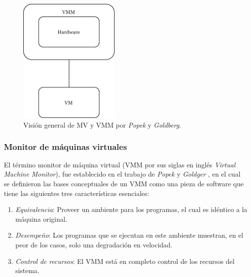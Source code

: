 \begin{figure}[!hbtp]
	\centering
	\includegraphics[width=5cm]{Pictures/VMMPopek1974.pdf}
	\vspace{-0.2cm}
	\caption{Visión general de MV y VMM por \textit{Popek} y \textit{Goldberg}.\footnotemark[2]{} }
	\label{fig:TheVirtualMachineMonitor_Popek1974}
\end{figure}


\subsubsection{Monitor de máquinas virtuales}

El término monitor de máquina virtual (VMM por sus siglas en inglés \textit{Virtual Machine Monitor}), fue establecido en el trabajo de \textit{Popek} y \textit{Goldger} \cite{Popek1974}, en el cual  se definieron las bases conceptuales de un VMM como una pieza de software que tiene las siguientes tres características esenciales: 
\begin{enumerate}
	\item \textit{Equivalencia}: Proveer un ambiente para los programas, el cual es idéntico a la máquina original.\\
	
	\item \textit{Desempeño}: Los programas que se ejecutan en este ambiente muestran, en el peor de los casos, solo una degradación en velocidad.\\
	
	\item \textit{Control de recursos}: El VMM está en completo control de los recursos del sistema.\\ 
\end{enumerate}

